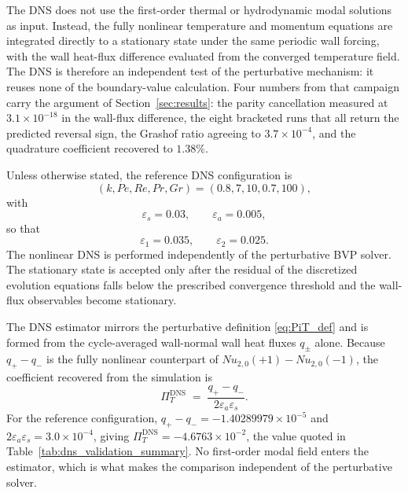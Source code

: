 \documentclass[12pt,a4paper]{article}
\newcommand{\Rey}{\mathit{Re}}
\newcommand{\Pe}{\mathit{Pe}}
\newcommand{\Grr}{\mathit{Gr}}
\newcommand{\Nu}{\mathit{Nu}}
\renewcommand{\Pr}{\mathit{Pr}}
\newcommand{\PiT}{\Pi_T}
\begin{document}
The DNS does not use the first-order thermal or hydrodynamic modal solutions
as input. Instead, the fully nonlinear temperature and momentum equations are
integrated directly to a stationary state under the same periodic wall
forcing, with the wall heat-flux difference evaluated from the converged
temperature field. The DNS is therefore an independent test of the perturbative mechanism: it reuses none of the boundary-value calculation. Four numbers from that campaign carry the argument
of Section~\ref{sec:results}: the parity cancellation measured at
$3.1\times10^{-18}$ in the wall-flux difference, the eight bracketed runs that
all return the predicted reversal sign, the Grashof ratio agreeing to
$3.7\times10^{-4}$, and the quadrature coefficient recovered to $1.38\%$.

Unless otherwise stated, the reference DNS configuration is
\begin{equation}
(k,\Pe,\Rey,\Pr,\Grr) = (0.8,7,10,0.7,100),
\end{equation}
with
\begin{equation}
\varepsilon_s=0.03,
\qquad
\varepsilon_a=0.005,
\end{equation}
so that
\begin{equation}
\varepsilon_1=0.035,
\qquad
\varepsilon_2=0.025.
\end{equation}
The nonlinear DNS is performed independently of the perturbative BVP
solver. The stationary state is accepted only after the residual of the
discretized evolution equations falls below the prescribed convergence
threshold and the wall-flux observables become stationary.

The DNS estimator mirrors the perturbative definition \eqref{eq:PiT_def} and
is formed from the cycle-averaged wall-normal wall heat fluxes $q_\pm$ alone.
Because $q_+-q_-$ is the fully nonlinear counterpart of
$\Nu_{2,0}(+1)-\Nu_{2,0}(-1)$, the coefficient recovered from the simulation is
\begin{equation}
  \PiT^{\mathrm{DNS}}
  \;=\;
  \frac{q_+-q_-}{2\varepsilon_a\varepsilon_s}.
  \label{eq:PiT_dns_estimator}
\end{equation}
For the reference configuration, $q_+-q_-=-1.40289979\times10^{-5}$ and
$2\varepsilon_a\varepsilon_s=3.0\times10^{-4}$, giving
$\PiT^{\mathrm{DNS}}=-4.6763\times10^{-2}$, the value quoted in
Table~\ref{tab:dns_validation_summary}. No first-order modal field enters the
estimator, which is what makes the comparison independent of the perturbative
solver.


\clearpage
\end{document}
